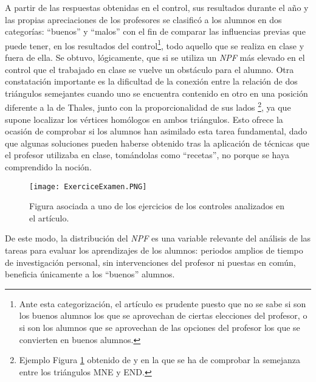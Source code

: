 	A partir de las respuestas obtenidas en el control, sus resultados durante el año y las propias apreciaciones de los profesores se clasificó a los alumnos en dos categorías: ``buenos'' y ``malos'' con el fin de comparar las influencias previas que puede tener, en los resultados del control\footnote{Ante esta categorización, el artículo es prudente puesto que no se sabe si son los buenos alumnos los que se aprovechan de ciertas elecciones del profesor, o si son los alumnos que se aprovechan de las opciones del profesor los que se convierten en buenos alumnos.}, todo aquello que se realiza en clase y fuera de ella. Se obtuvo, lógicamente, que si se utiliza un \textit{NPF} más elevado en el control que el trabajado en clase se vuelve un obstáculo para el alumno. %
 Otra constatación importante es la dificultad de la conexión entre la relación de dos triángulos semejantes cuando uno se encuentra contenido en otro  en una posición diferente a la de Thales, junto con la proporcionalidad de sus lados \footnote{Ejemplo Figura \ref{ExerciceExamen} obtenido de \citet[p. 402]{Horoks} y \citet[p. 131]{TH} en la que se ha de comprobar la semejanza entre los triángulos MNE y END.}, ya que supone localizar los vértices homólogos en ambos triángulos. Esto ofrece la ocasión de comprobar si los alumnos han asimilado esta tarea fundamental, dado que algunas soluciones pueden haberse obtenido tras la aplicación de técnicas que el profesor utilizaba en clase, tomándolas como ``recetas'', no porque se haya comprendido la noción.
 
 \begin{figure}
 	\centering
 	\texttt{[image: ExerciceExamen.PNG]}
 	\caption{Figura asociada a uno de los ejercicios de los controles analizados en el artículo.}
 	\label{ExerciceExamen}
 \end{figure}

	De este modo, la distribución del \textit{NPF} es una variable relevante del análisis de las tareas para evaluar los aprendizajes de los alumnos: periodos amplios de tiempo de investigación personal, sin intervenciones del profesor ni puestas en común, beneficia únicamente a los ``buenos'' alumnos. 
	
